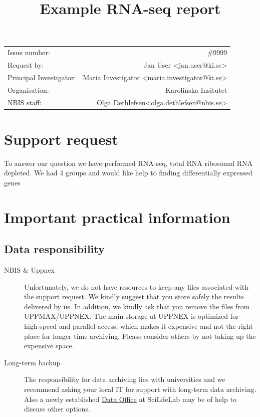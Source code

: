 \documentclass[12pt]{article}
\makeatletter
\newcommand{\staff}{Olga Dethlefsen}
\newcommand{\staffEmail}{olga.dethlefsen@nbis.se}
\newcommand{\noIssue}{\#9999}
\makeatother
\begin{document}
\pagestyle{fancy}


\title{Example RNA-seq report}
\author{}
\maketitle
\thispagestyle{fancy}

\vspace{2cm}
\begin{center}
\begin{tabular}{l r}
Issue number: & {\noIssue} \\
Request by: & Jan User <jan.user@ki.se> \\ 
Principal Investigator: & Maria Investigator <maria.investigator@ki.se> \\
Organisation: & Karolinska Insitutet \\
NBIS staff: & {\staff}<{\staffEmail}>
\end{tabular}
\end{center}

\newpage
\tableofcontents

\newpage
\section{Support request}

To answer our question we have performed RNA-seq, total RNA ribosomal RNA depleted. We had 4 groups and would like help to finding differentially expressed genes

\section{Important practical information}
\subsection{Data responsibility}
\label{DataRes}
\footnotesize
\begin{description}
\item [NBIS \& Uppnex] Unfortunately, we do not have resources to keep any files associated with the support request. We kindly suggest that you store safely the results delivered by us. In addition, we kindly ask that you remove the files from UPPMAX/UPPNEX. The main storage at UPPNEX is optimized for high-speed and parallel access, which makes it expensive and not the right place for longer time archiving. Please consider others by not taking up the expensive space.
  \item[Long-term backup] The responsibility for data archiving lies with universities and we recommend asking your local IT for support with long-term data archiving. Also a newly established \href{https://www.scilifelab.se/data/}{Data Office} at SciLifeLab may be of help to discuss other options. 
  \end{description}
\end{document}
